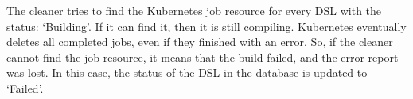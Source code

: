 The cleaner tries to find the Kubernetes job resource for every DSL with the status: `Building'. If it can find it, then it is still compiling. Kubernetes eventually deletes all completed jobs, even if they finished with an error. So, if the cleaner cannot find the job resource, it means that the build failed, and the error report was lost. In this case, the status of the DSL in the database is updated to `Failed'.